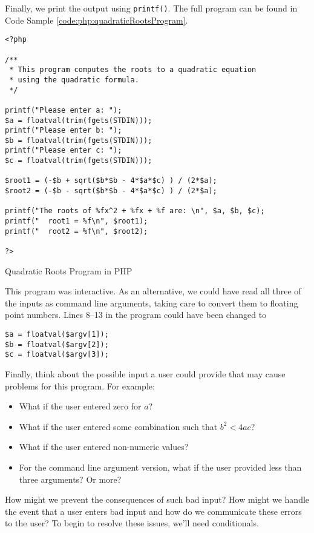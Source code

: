 Finally, we print the output using \texttt{printf()}.  The full program 
can be found in Code Sample \ref{code:php:quadraticRootsProgram}.

\begin{listing}[h]
\begin{verbatim}
<?php

/**
 * This program computes the roots to a quadratic equation
 * using the quadratic formula.
 */

printf("Please enter a: ");
$a = floatval(trim(fgets(STDIN)));
printf("Please enter b: ");
$b = floatval(trim(fgets(STDIN)));
printf("Please enter c: ");
$c = floatval(trim(fgets(STDIN)));

$root1 = (-$b + sqrt($b*$b - 4*$a*$c) ) / (2*$a);
$root2 = (-$b - sqrt($b*$b - 4*$a*$c) ) / (2*$a);

printf("The roots of %fx^2 + %fx + %f are: \n", $a, $b, $c);
printf("  root1 = %f\n", $root1);
printf("  root2 = %f\n", $root2);

?>
\end{verbatim}
\caption{Quadratic Roots Program in PHP}
\label{code:php:quadraticRootsProgram}
\end{listing}

This program was interactive.  As an alternative, we could have read 
all three of the inputs as command line arguments, taking care 
to convert them to floating point numbers.  Lines 8--13 in the
program could have been changed to 

\begin{verbatim}
$a = floatval($argv[1]);
$b = floatval($argv[2]);
$c = floatval($argv[3]);
\end{verbatim}

Finally, think about the possible input a user could provide that may cause problems
for this program.  For example:
\begin{itemize}
  \item What if the user entered zero for $a$?
  \item What if the user entered some combination such that $b^2 < 4ac$?
  \item What if the user entered non-numeric values?
  \item For the command line argument version, what if the user provided less than
  	three arguments?  Or more?
\end{itemize}
How might we prevent the consequences of such bad input?  
How might we handle the event that a user enters bad input and
how do we communicate these errors to the user?  To begin to resolve
these issues, we'll need conditionals.





